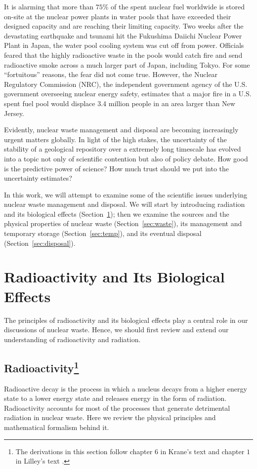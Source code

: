 \documentclass[nofootinbib,preprint,aps]{revtex4-1}
\begin{document}
It is alarming that more than $75\%$ of the spent nuclear fuel worldwide is stored on-site at the nuclear power plants
in water pools that have exceeded their designed capacity and are reaching their limiting capacity.\cite{aa12}
Two weeks after the devastating earthquake and tsunami hit the Fukushima Daiichi Nuclear Power Plant in Japan,
the water pool cooling system was cut off from power. Officials feared that
the highly radioactive waste in the pools would catch fire and send radioactive smoke
across a much larger part of Japan, including Tokyo.\cite{s16} For some ``fortuitous'' reasons, the fear did not come true.
However, the Nuclear Regulatory Commission (NRC), the independent government agency
of the U.S. government overseeing nuclear energy safety,
estimates that a major fire in a U.S. spent fuel pool would
displace 3.4 million people in an area larger than New Jersey.\cite{s16}

Evidently, nuclear waste management and disposal are becoming increasingly urgent matters globally.
In light of the high stakes,
the uncertainty of the stability of a geological repository over a extremely long timescale has evolved into 
a topic not only of scientific contention but also of policy debate.
How good is the predictive power of science? How much trust should we put into the uncertainty estimates?

In this work, we will attempt to examine some of the scientific issues underlying nuclear waste management
and disposal. We will start by introducing radiation and its biological effects (Section~\ref{sec:phys}); then
we examine the sources and the physical properties of nuclear waste (Section~\ref{sec:waste}),
its management and temporary storage (Section~\ref{sec:temp}), and its eventual disposal (Section~\ref{sec:disposal}).

\section{Radioactivity and Its Biological Effects}
\label{sec:phys}
The principles of radioactivity and its biological effects play a central role in our
discussions of nuclear waste. Hence, we should first review and extend our understanding of 
radioactivity and radiation.
    \subsection{Radioactivity\footnote{
    The derivations in this section follow chapter $6$ in
    Krane's text \cite{k88} and chapter $1$ in Lilley's text \cite{l01}.
    }}
    Radioactive decay is the process in which a nucleus decays from a higher energy state to a lower
    energy state and releases energy in the form of radiation. Radioactivity accounts for
    most of the processes that generate detrimental radiation in nuclear waste.
    Here we review the physical principles and mathematical formalism behind it.
\end{document}

